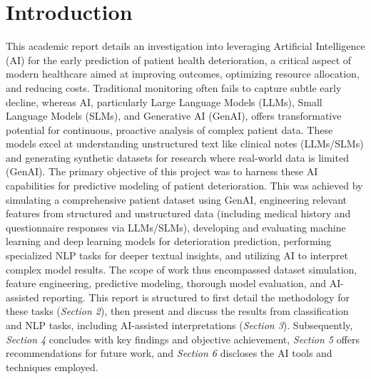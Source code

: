\section{Introduction}

This academic report details an investigation into leveraging Artificial Intelligence (AI) for the early prediction of patient health deterioration, a critical aspect of modern healthcare aimed at improving outcomes, optimizing resource allocation, and reducing costs. Traditional monitoring often fails to capture subtle early decline, whereas AI, particularly Large Language Models (LLMs), Small Language Models (SLMs), and Generative AI (GenAI), offers transformative potential for continuous, proactive analysis of complex patient data. These models excel at understanding unstructured text like clinical notes (LLMs/SLMs) and generating synthetic datasets for research where real-world data is limited (GenAI). The primary objective of this project was to harness these AI capabilities for predictive modeling of patient deterioration. This was achieved by simulating a comprehensive patient dataset using GenAI, engineering relevant features from structured and unstructured data (including medical history and questionnaire responses via LLMs/SLMs), developing and evaluating machine learning and deep learning models for deterioration prediction, performing specialized NLP tasks for deeper textual insights, and utilizing AI to interpret complex model results. The scope of work thus encompassed dataset simulation, feature engineering, predictive modeling, thorough model evaluation, and AI-assisted reporting. This report is structured to first detail the methodology for these tasks (\textit{Section 2}), then present and discuss the results from classification and NLP tasks, including AI-assisted interpretations (\textit{Section 3}). Subsequently, \textit{Section 4} concludes with key findings and objective achievement, \textit{Section 5} offers recommendations for future work, and \textit{Section 6} discloses the AI tools and techniques employed.
